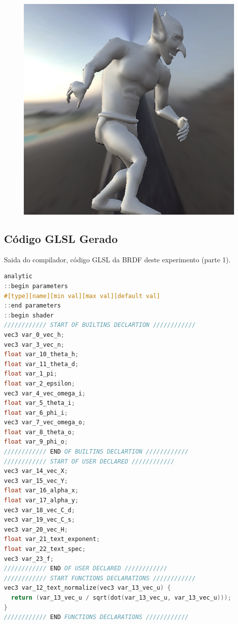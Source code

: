 \begin{figure}[H]
\endminipage\hfill
{}%
  \includegraphics[width=\linewidth]{./Imagens/brdfs/ward-goblin.png}
\endminipage
\end{figure}

\subsection{Código GLSL Gerado}
\begin{codigo}[H]
    \caption{\small Saida do compilador, código GLSL da BRDF deste experimento (parte 1). }
    \label{cod-ward-glsl-pt-1}
\begin{lstlisting}[language=C, inputencoding=utf8]
analytic
::begin parameters
#[type][name][min val][max val][default val]
::end parameters
::begin shader
//////////// START OF BUILTINS DECLARTION ////////////
vec3 var_0_vec_h;
vec3 var_3_vec_n;
float var_10_theta_h;
float var_11_theta_d;
float var_1_pi;
float var_2_epsilon;
vec3 var_4_vec_omega_i;
float var_5_theta_i;
float var_6_phi_i;
vec3 var_7_vec_omega_o;
float var_8_theta_o;
float var_9_phi_o;
//////////// END OF BUILTINS DECLARTION ////////////
//////////// START OF USER DECLARED ////////////
vec3 var_14_vec_X;
vec3 var_15_vec_Y;
float var_16_alpha_x;
float var_17_alpha_y;
vec3 var_18_vec_C_d;
vec3 var_19_vec_C_s;
vec3 var_20_vec_H;
float var_21_text_exponent;
float var_22_text_spec;
vec3 var_23_f;
//////////// END OF USER DECLARED ////////////
//////////// START FUNCTIONS DECLARATIONS ////////////
vec3 var_12_text_normalize(vec3 var_13_vec_u) {
  return (var_13_vec_u / sqrt(dot(var_13_vec_u, var_13_vec_u)));
}
//////////// END FUNCTIONS DECLARATIONS ////////////
\end{lstlisting}
\end{codigo}

